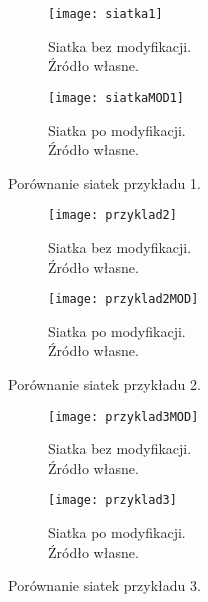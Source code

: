 \documentclass[12pt]{report}
\begin{document}
\begin{sloppypar}
\begin{figure}[!htp]
\centering
\begin{subfigure}{.68\textwidth}
  \centering
  \texttt{[image: siatka1]}
\caption{Siatka bez modyfikacji.\\Źródło własne. \label{przyklad1.siatka}}
\end{subfigure}
%
\begin{subfigure}{.68\textwidth}
  \centering
  \texttt{[image: siatkaMOD1]}
\caption{Siatka po modyfikacji.\\Źródło własne. \label{przyklad1.siatkaMOD}}
\end{subfigure}
\caption{Porównanie siatek przykładu 1.}
\label{przyklad1}
\end{figure}
\FloatBarrier
\begin{figure}[!htp]
\centering
\begin{subfigure}{.68\textwidth}
  \centering
  \texttt{[image: przyklad2]}
\caption{Siatka bez modyfikacji.\\Źródło własne. \label{przyklad2.siatka}}
\end{subfigure}
%
\begin{subfigure}{.68\textwidth}
  \centering
  \texttt{[image: przyklad2MOD]}
\caption{Siatka po modyfikacji.\\Źródło własne. \label{przyklad2.siatkaMOD}}
\end{subfigure}
\caption{Porównanie siatek przykładu 2.}
\label{przyklad2}
\end{figure}
\begin{figure}[!htp]
\centering
\begin{subfigure}{.9\textwidth}
  \centering
  \texttt{[image: przyklad3MOD]}
\caption{Siatka bez modyfikacji.\\Źródło własne. \label{przyklad3.siatka}}
\end{subfigure}
%
\begin{subfigure}{.9\textwidth}
  \centering
  \texttt{[image: przyklad3]}
\caption{Siatka po modyfikacji.\\Źródło własne. \label{przyklad3.siatkaMOD}}
\end{subfigure}
\caption{Porównanie siatek przykładu 3.}
\label{przyklad3}
\end{figure}














\end{sloppypar}
\end{document}

